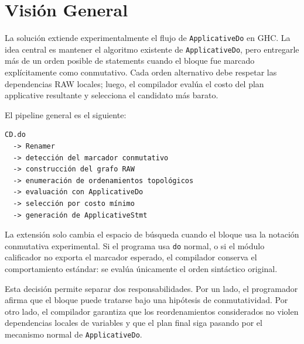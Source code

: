 
\section{Visión General}

La solución extiende experimentalmente el flujo de \texttt{ApplicativeDo} en \textsf{GHC}. La idea central es mantener el algoritmo existente de \texttt{ApplicativeDo}, pero entregarle más de un orden posible de statements cuando el bloque fue marcado explícitamente como conmutativo. Cada orden alternativo debe respetar las dependencias RAW locales; luego, el compilador evalúa el costo del plan applicative resultante y selecciona el candidato más barato.

El pipeline general es el siguiente:

\begin{verbatim}
CD.do
  -> Renamer
  -> detección del marcador conmutativo
  -> construcción del grafo RAW
  -> enumeración de ordenamientos topológicos
  -> evaluación con ApplicativeDo
  -> selección por costo mínimo
  -> generación de ApplicativeStmt
\end{verbatim}

La extensión solo cambia el espacio de búsqueda cuando el bloque usa la notación conmutativa experimental. Si el programa usa \texttt{do} normal, o si el módulo calificador no exporta el marcador esperado, el compilador conserva el comportamiento estándar: se evalúa únicamente el orden sintáctico original.

Esta decisión permite separar dos responsabilidades. Por un lado, el programador afirma que el bloque puede tratarse bajo una hipótesis de conmutatividad. Por otro lado, el compilador garantiza que los reordenamientos considerados no violen dependencias locales de variables y que el plan final siga pasando por el mecanismo normal de \texttt{ApplicativeDo}.

